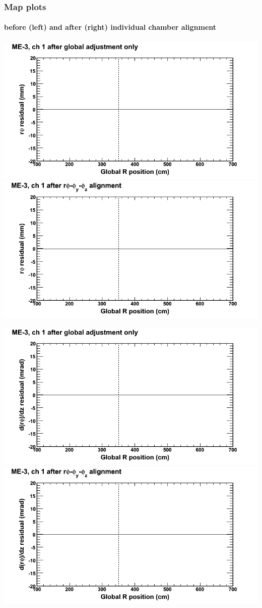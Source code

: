 \documentclass[compress]{beamer}
\begin{document}
\begin{frame}
\frametitle{Map plots}
\framesubtitle{before (left) and after (right) individual chamber alignment}
\includegraphics[width=0.5\linewidth]{ringmapplots_3dof/before_CSCvsr_mem3ch01_x.png} \includegraphics[width=0.5\linewidth]{ringmapplots_3dof/after_CSCvsr_mem3ch01_x.png}

\includegraphics[width=0.5\linewidth]{ringmapplots_3dof/before_CSCvsr_mem3ch01_dxdz.png} \includegraphics[width=0.5\linewidth]{ringmapplots_3dof/after_CSCvsr_mem3ch01_dxdz.png}
\end{frame}
\end{document}
